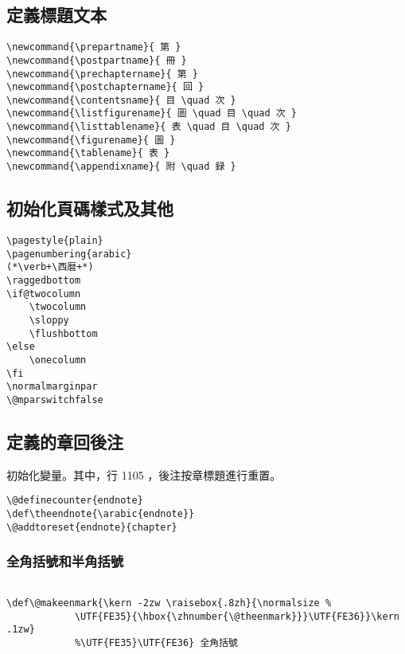 \subsection{定義標題文本}

\begin{lstlisting}[firstnumber=1078]
\newcommand{\prepartname}{ 第 }
\newcommand{\postpartname}{ 冊 }
\newcommand{\prechaptername}{ 第 }
\newcommand{\postchaptername}{ 回 }
\newcommand{\contentsname}{ 目 \quad 次 }
\newcommand{\listfigurename}{ 圖 \quad 目 \quad 次 }
\newcommand{\listtablename}{ 表 \quad 目 \quad 次 }
\newcommand{\figurename}{ 圖 }
\newcommand{\tablename}{ 表 }
\newcommand{\appendixname}{ 附 \quad 録 }
\end{lstlisting}

\subsection{初始化頁碼樣式及其他}

\begin{lstlisting}[firstnumber=1088]
\pagestyle{plain}
\pagenumbering{arabic}
(*\verb+\西暦+*)
\raggedbottom
\if@twocolumn
	\twocolumn
	\sloppy
	\flushbottom
\else
	\onecolumn
\fi
\normalmarginpar
\@mparswitchfalse
\end{lstlisting}


\subsection{定義的章回後注}

\par 初始化變量。其中，行 1105 ，後注按章標題進行重置。
\begin{lstlisting}[firstnumber=1103]
\@definecounter{endnote}
\def\theendnote{\arabic{endnote}}
\@addtoreset{endnote}{chapter}
\end{lstlisting}



\subsubsection{全角括號和半角括號}

\begin{lstlisting}[firstnumber=1107]
%\def\@makeenmark{\kern -1.2zw \raisebox{.8zh}{\tiny （{\hbox{\yoko\expandafter\ajTsumesuji\expandafter*\expandafter{\number\@theenmark}}}）}}

\def\@makeenmark{\kern -2zw \raisebox{.8zh}{\normalsize %
			\UTF{FE35}{\hbox{\zhnumber{\@theenmark}}}\UTF{FE36}}\kern .1zw}
			%\UTF{FE35}\UTF{FE36} 全角括號
\end{lstlisting}



